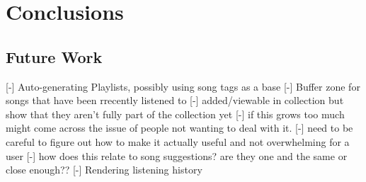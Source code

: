 \chapter{Conclusions}%


\section{Future Work}
[-] Auto-generating Playlists, possibly using song tags as a base
[-] Buffer zone for songs that have been rrecently listened to
    [-] added/viewable in collection but show that they aren't fully part of the collection yet
    [-] if this grows too much might come across the issue of people not wanting to deal with it.
    [-] need to be careful to figure out how to make it actually useful and not overwhelming for a user
    [-] how does this relate to song suggestions? are they one and the same or close enough??
[-] Rendering listening history